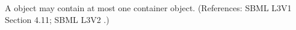 A \KineticLaw object may contain at most one \ListOfLocalParameters
container object.  (References: SBML L3V1 Section 4.11; SBML L3V2 .)
